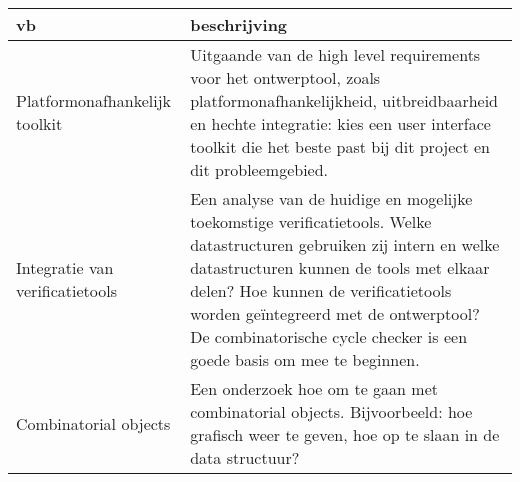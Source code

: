 \begin{center}
    \begin{tabular}{|p{13em}|p{22em}|}
    \hline
        {\bf vb}		& {\bf beschrijving} \\\hline

Platformonafhankelijk toolkit &
Uitgaande van de high level requirements voor het ontwerptool, zoals
platformonafhankelijkheid, uitbreidbaarheid en hechte integratie: kies een user interface
toolkit die het beste past bij dit project en dit probleemgebied.\\\hline

Integratie van verificatietools &
Een analyse van de huidige en mogelijke toekomstige verificatietools. Welke
datastructuren gebruiken zij intern en welke datastructuren kunnen de tools
met elkaar delen? Hoe kunnen de verificatietools worden ge\"integreerd met
de ontwerptool? De combinatorische cycle checker is een goede basis om mee
te beginnen.\\\hline

Combinatorial objects &
Een onderzoek hoe om te gaan met combinatorial objects. Bijvoorbeeld: hoe grafisch weer
te geven, hoe op te slaan in de data structuur?\\\hline

    \end{tabular}
\end{center}



